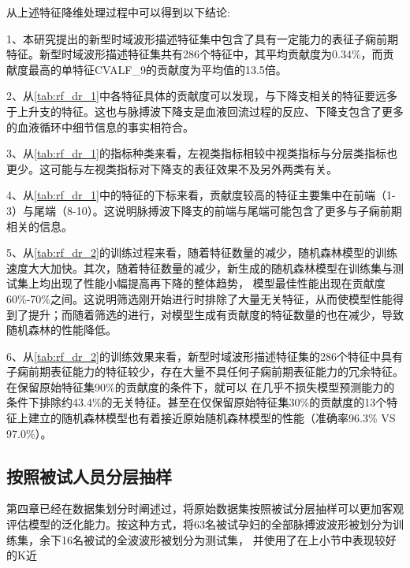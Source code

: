 从上述特征降维处理过程中可以得到以下结论:

1、本研究提出的新型时域波形描述特征集中包含了具有一定能力的表征子痫前期特征。新型时域波形描述特征集共有286个特征中，其平均贡献度为0.34\%，而贡献度最高的单特征CVALF\_9的贡献度为平均值的13.5倍。

2、从\autoref{tab:rf_dr_1}中各特征具体的贡献度可以发现，与下降支相关的特征要远多于上升支的特征。这也与脉搏波下降支是血液回流过程的反应、下降支包含了更多的血液循环中细节信息的事实相符合。

3、从\autoref{tab:rf_dr_1}的指标种类来看，左视类指标相较中视类指标与分层类指标也更少。这可能与左视类指标对下降支的表征效果不及另外两类有关。

4、从\autoref{tab:rf_dr_1}中的特征的下标来看，贡献度较高的特征主要集中在前端（1-3）与尾端（8-10）。这说明脉搏波下降支的前端与尾端可能包含了更多与子痫前期相关的信息。

5、从\autoref{tab:rf_dr_2}的训练过程来看，随着特征数量的减少，随机森林模型的训练速度大大加快。其次，随着特征数量的减少，新生成的随机森林模型在训练集与测试集上均出现了性能小幅提高再下降的整体趋势，
模型最佳性能出现在贡献度60\%-70\%之间。这说明筛选刚开始进行时排除了大量无关特征，从而使模型性能得到了提升；而随着筛选的进行，对模型生成有贡献度的特征数量的也在减少，导致随机森林的性能降低。

6、从\autoref{tab:rf_dr_2}的训练效果来看，新型时域波形描述特征集的286个特征中具有子痫前期表征能力的特征较少，存在大量不具任何子痫前期表征能力的冗余特征。在保留原始特征集90\%的贡献度的条件下，就可以
在几乎不损失模型预测能力的条件下排除约43.4\%的无关特征。甚至在仅保留原始特征集30\%的贡献度的13个特征上建立的随机森林模型也有着接近原始随机森林模型的性能（准确率96.3\% VS 97.0\%）。

\subsection{按照被试人员分层抽样}

第四章已经在数据集划分时阐述过，将原始数据集按照被试分层抽样可以更加客观评估模型的泛化能力。按这种方式，将63名被试孕妇的全部脉搏波波形被划分为训练集，余下16名被试的全波波形被划分为测试集，
并使用了在上小节中表现较好的K近

